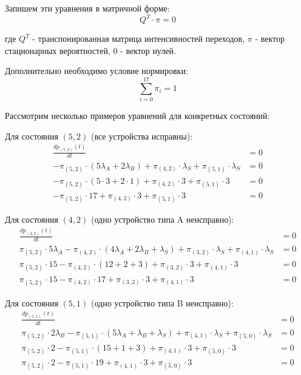 Запишем эти уравнения в матричной форме:
\begin{equation}
Q^T \cdot \pi = 0
\end{equation}

где $Q^T$ - транспонированная матрица интенсивностей переходов, $\pi$ - вектор стационарных вероятностей, $0$ - вектор нулей.

Дополнительно необходимо условие нормировки:
\begin{equation}
\sum_{i=0}^{17} \pi_i = 1
\end{equation}

Рассмотрим несколько примеров уравнений для конкретных состояний:

Для состояния $(5, 2)$ (все устройства исправны):
\begin{align}
\frac{dp_{(5,2)}(t)}{dt} &= 0 \\
-\pi_{(5,2)} \cdot (5\lambda_A + 2\lambda_B) + \pi_{(4,2)} \cdot \lambda_S + \pi_{(5,1)} \cdot \lambda_S &= 0 \\
-\pi_{(5,2)} \cdot (5 \cdot 3 + 2 \cdot 1) + \pi_{(4,2)} \cdot 3 + \pi_{(5,1)} \cdot 3 &= 0 \\
-\pi_{(5,2)} \cdot 17 + \pi_{(4,2)} \cdot 3 + \pi_{(5,1)} \cdot 3 &= 0
\end{align}

Для состояния $(4, 2)$ (одно устройство типа A неисправно):
\begin{align}
\frac{dp_{(4,2)}(t)}{dt} &= 0 \\
\pi_{(5,2)} \cdot 5\lambda_A - \pi_{(4,2)} \cdot (4\lambda_A + 2\lambda_B + \lambda_S) + \pi_{(3,2)} \cdot \lambda_S + \pi_{(4,1)} \cdot \lambda_S &= 0 \\
\pi_{(5,2)} \cdot 15 - \pi_{(4,2)} \cdot (12 + 2 + 3) + \pi_{(3,2)} \cdot 3 + \pi_{(4,1)} \cdot 3 &= 0 \\
\pi_{(5,2)} \cdot 15 - \pi_{(4,2)} \cdot 17 + \pi_{(3,2)} \cdot 3 + \pi_{(4,1)} \cdot 3 &= 0
\end{align}

Для состояния $(5, 1)$ (одно устройство типа B неисправно):
\begin{align}
\frac{dp_{(5,1)}(t)}{dt} &= 0 \\
\pi_{(5,2)} \cdot 2\lambda_B - \pi_{(5,1)} \cdot (5\lambda_A + \lambda_B + \lambda_S) + \pi_{(4,1)} \cdot \lambda_S + \pi_{(5,0)} \cdot \lambda_S &= 0 \\
\pi_{(5,2)} \cdot 2 - \pi_{(5,1)} \cdot (15 + 1 + 3) + \pi_{(4,1)} \cdot 3 + \pi_{(5,0)} \cdot 3 &= 0 \\
\pi_{(5,2)} \cdot 2 - \pi_{(5,1)} \cdot 19 + \pi_{(4,1)} \cdot 3 + \pi_{(5,0)} \cdot 3 &= 0
\end{align}

